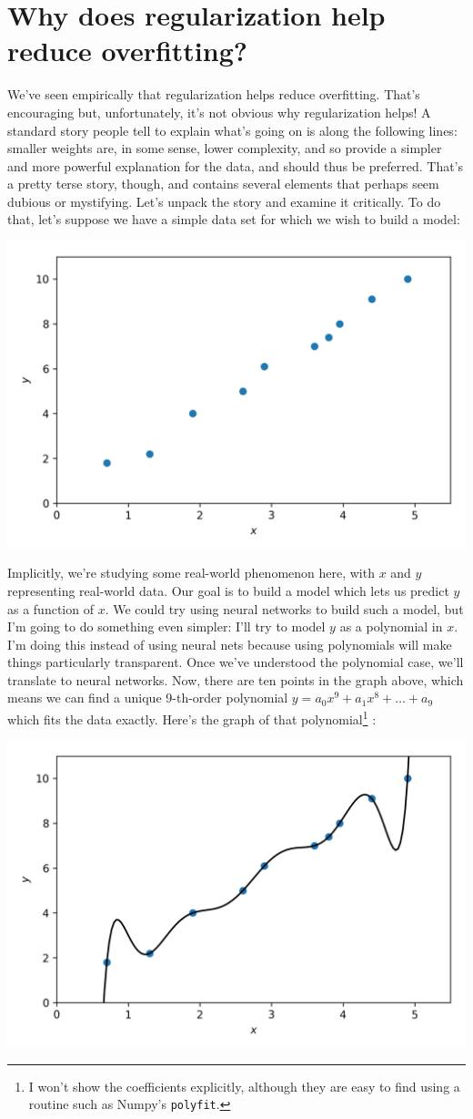 \documentclass[a4paper,twoside,10pt]{book}
\begin{document}
\section{Why does regularization help reduce overfitting?}
We've seen empirically that regularization helps reduce overfitting. That's encouraging but, unfortunately, it's not obvious why regularization helps! A standard story people tell to explain what's going on is along the following lines: smaller weights are, in some sense, lower complexity, and so provide a simpler and more powerful explanation for the data, and should thus be preferred. That's a pretty terse story, though, and contains several elements that perhaps seem dubious or mystifying. Let's unpack the story and examine it critically. To do that, let's suppose we have a simple data set for which we wish to build a model:
\begin{center}
	\includegraphics[width=0.7\linewidth]{figures/ch3/animation_overfitting1}
\end{center}
Implicitly, we're studying some real-world phenomenon here, with $x$ and $y$ representing real-world data. Our goal is to build a model which lets us predict $y$ as a function of $x$. We could try using neural networks to build such a model, but I'm going to do something even simpler: I'll try to model $y$ as a polynomial in $x$. I'm doing this instead of using neural nets because using polynomials will make things particularly transparent. Once we've understood the polynomial case, we'll translate to neural networks. Now, there are ten points in the graph above, which means we can find a unique 9-th-order polynomial $y=a_0x^9+a_1x^8+\ldots+a_9$ which fits the data exactly. Here's the graph of that polynomial\footnote{I won't show the coefficients explicitly, although they are easy to find using a routine such as Numpy's \texttt{polyfit}.} :
\begin{center}
	\includegraphics[width=0.7\linewidth]{figures/ch3/animation_overfitting2}
	\end{center}
\end{document}

